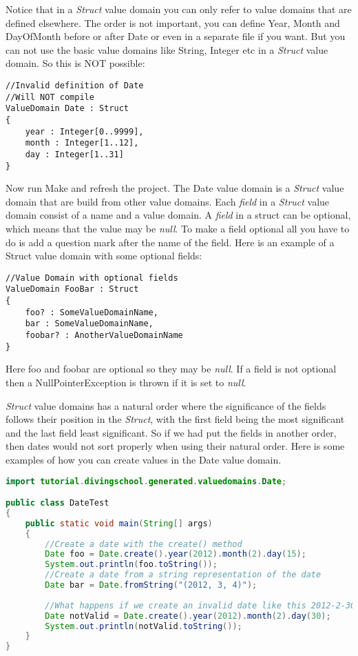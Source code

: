 Notice that in a \emph{Struct} value domain you can only refer to
value domains that are defined elsewhere. The order is not important,
you can define Year, Month and DayOfMonth before or after Date or
even in a separate file if you want. But you can not use the basic
value domains like String, Integer etc in a \emph{Struct} value domain.
So this is NOT possible:

\begin{lstlisting}[basicstyle={\scriptsize}]
//Invalid definition of Date
//Will NOT compile
ValueDomain Date : Struct
{
	year : Integer[0..9999],
	month : Integer[1..12],
	day : Integer[1..31]
}
\end{lstlisting}


Now run Make and refresh the project. The Date value domain is a \emph{Struct}
value domain that are build from other value domains. Each \emph{field}
in a \emph{Struct} value domain consist of a name and a value domain.
A \emph{field} in a struct can be optional, which means that the value
may be \emph{null}. To make a field optional all you have to do is
add a question mark after the name of the field. Here is an example
of a Struct value domain with some optional fields:

\begin{lstlisting}[basicstyle={\scriptsize}]
//Value Domain with optional fields
ValueDomain FooBar : Struct
{
	foo? : SomeValueDomainName,
	bar : SomeValueDomainName,
	foobar? : AnotherValueDomainName
}
\end{lstlisting}


Here foo and foobar are optional so they may be \emph{null}. If a
field is not optional then a NullPointerException is thrown if it
is set to \emph{null}.

\emph{Struct} value domains has a natural order where the significance
of the fields follows their position in the \emph{Struct}, with the
first field being the most significant and the last field least significant.
So if we had put the fields in another order, then dates would not
sort properly when using their natural order. Here is some examples
of how you can create values in the Date value domain.
\begin{lstlisting}[basicstyle={\scriptsize},breaklines=true,language=Java,tabsize=2]
import tutorial.divingschool.generated.valuedomains.Date;

public class DateTest
{
	public static void main(String[] args)
	{
		//Create a date with the create() method
		Date foo = Date.create().year(2012).month(2).day(15);
		System.out.println(foo.toString());
		//Create a date from a string representation of the date
		Date bar = Date.fromString("(2012, 3, 4)");
		
		//What happens if we create an invalid date like this 2012-2-30
		Date notValid = Date.create().year(2012).month(2).day(30);
		System.out.println(notValid.toString());
	}
}
\end{lstlisting}


